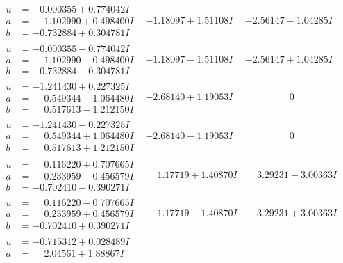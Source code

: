 \documentclass[1p]{elsarticle_modified}
\theoremstyle{definition}
\begin{document}
$$\begin{array}{c|c|c}
 \hline 
\begin{aligned}
u &= -0.000355 + 0.774042 I \\
a &= \phantom{-}1.102990 + 0.498400 I \\
b &= -0.732884 + 0.304781 I\end{aligned}
 & -1.18097 + 1.51108 I & -2.56147 - 1.04285 I \\ \hline\begin{aligned}
u &= -0.000355 - 0.774042 I \\
a &= \phantom{-}1.102990 - 0.498400 I \\
b &= -0.732884 - 0.304781 I\end{aligned}
 & -1.18097 - 1.51108 I & -2.56147 + 1.04285 I \\ \hline\begin{aligned}
u &= -1.241430 + 0.227325 I \\
a &= \phantom{-}0.549344 - 1.064480 I \\
b &= \phantom{-}0.517613 - 1.212150 I\end{aligned}
 & -2.68140 + 1.19053 I & \phantom{-0.000000 } 0 \\ \hline\begin{aligned}
u &= -1.241430 - 0.227325 I \\
a &= \phantom{-}0.549344 + 1.064480 I \\
b &= \phantom{-}0.517613 + 1.212150 I\end{aligned}
 & -2.68140 - 1.19053 I & \phantom{-0.000000 } 0 \\ \hline\begin{aligned}
u &= \phantom{-}0.116220 + 0.707665 I \\
a &= \phantom{-}0.233959 - 0.456579 I \\
b &= -0.702410 - 0.390271 I\end{aligned}
 & \phantom{-}1.17719 + 1.40870 I & \phantom{-}3.29231 - 3.00363 I \\ \hline\begin{aligned}
u &= \phantom{-}0.116220 - 0.707665 I \\
a &= \phantom{-}0.233959 + 0.456579 I \\
b &= -0.702410 + 0.390271 I\end{aligned}
 & \phantom{-}1.17719 - 1.40870 I & \phantom{-}3.29231 + 3.00363 I \\ \hline\begin{aligned}
u &= -0.715312 + 0.028489 I \\
a &= \phantom{-}2.04561 + 1.88867 I \\

\end{aligned}
\end{array}$$
\end{document}
